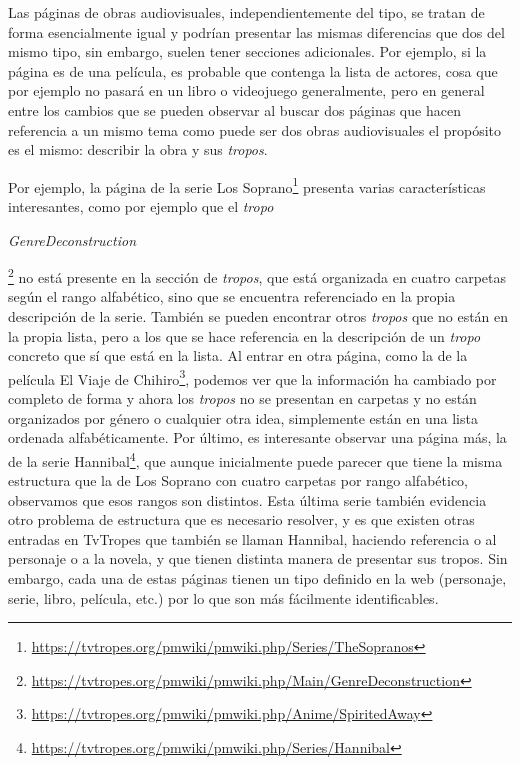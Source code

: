 Las páginas de obras audiovisuales, independientemente del tipo, se tratan de
forma esencialmente igual y podrían presentar las mismas diferencias que dos del
mismo tipo, sin embargo, suelen tener secciones adicionales. Por ejemplo, si la
página es de una película, es probable que contenga la lista de actores, cosa
que por ejemplo no pasará en un libro o videojuego generalmente, pero en general
entre los cambios que se pueden observar al buscar dos páginas que hacen
referencia a un mismo tema como puede ser dos obras audiovisuales el propósito
es el mismo: describir la obra y sus \textit{tropos}.

Por ejemplo, la página de la serie Los
Soprano\footnote{\url{https://tvtropes.org/pmwiki/pmwiki.php/Series/TheSopranos}}
presenta varias características interesantes, como por ejemplo que el
\textit{tropo}
\begin{otherlanguage}{english}\textit{GenreDeconstruction}\end{otherlanguage}\footnote{\url{https://tvtropes.org/pmwiki/pmwiki.php/Main/GenreDeconstruction}}
no está presente en la sección de \textit{tropos}, que está organizada en cuatro
carpetas según el rango alfabético, sino que se encuentra referenciado en la
propia descripción de la serie. También se pueden encontrar otros
\textit{tropos} que no están en la propia lista, pero a los que se hace
referencia en la descripción de un \textit{tropo} concreto que sí que está en la
lista. Al entrar en otra página, como la de la película El Viaje de
Chihiro\footnote{\url{https://tvtropes.org/pmwiki/pmwiki.php/Anime/SpiritedAway}},
podemos ver que la información ha cambiado por completo de forma y ahora los
\textit{tropos} no se presentan en carpetas y no están organizados por género o
cualquier otra idea, simplemente están en una lista ordenada alfabéticamente.
Por último, es interesante observar una página más, la de la serie
Hannibal\footnote{\url{https://tvtropes.org/pmwiki/pmwiki.php/Series/Hannibal}},
que aunque inicialmente puede parecer que tiene la misma estructura que la de
Los Soprano con cuatro carpetas por rango alfabético, observamos que esos rangos
son distintos. Esta última serie también evidencia otro problema de estructura
que es necesario resolver, y es que existen otras entradas en TvTropes que
también se llaman Hannibal, haciendo referencia o al personaje o a la novela, y
que tienen distinta manera de presentar sus tropos. Sin embargo, cada una de
estas páginas tienen un tipo definido en la web (personaje, serie, libro,
película, etc.) por lo que son más fácilmente identificables.

